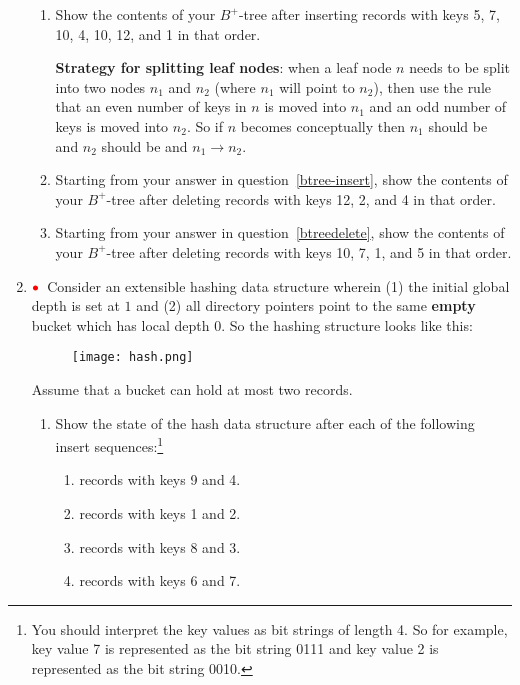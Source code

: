 \documentclass{article}
\newcommand{\redbullet}{$\textcolor{red}{\bullet}$}
\begin{document}
\begin{enumerate}[resume]
\begin{enumerate}
\item \label{btree-insert} Show the contents of your $B^+$-tree after
inserting records with keys 5, 7, 10, 4, 10, 12, and 1 in that order.

{\bf Strategy for splitting leaf nodes}: when a leaf node $n$ needs to be split into two nodes $n_1$ and $n_2$ (where $n_1$ will point to $n_2$), then use the
rule that an even number of keys in $n$ is moved into $n_1$ and an odd number of keys is moved into $n_2$.   So if $n$ becomes conceptually  then $n_1$ should be  and $n_2$ should be  and $n_1 \rightarrow n_2$.

\item\label{btreedelete} Starting from your answer in question~\ref{btree-insert}, show
  the contents of your $B^+$-tree after deleting records with keys 12, 2, and 4 in that order.
\item Starting from your answer in question~\ref{btreedelete}, show
  the contents of your $B^+$-tree after deleting records with keys 10, 7, 1, and 5 in that order.
\end{enumerate}

\newpage
\item \redbullet\ 
Consider an extensible hashing data structure wherein (1) the
initial global depth is set at $1$ and (2) all directory pointers point
to the same {\bf empty} bucket which has local depth $0$. So the hashing
structure looks like this:
\begin{figure}[h]
        \centering
        \texttt{[image: hash.png]}
    \end{figure}
\bigskip
Assume that a bucket can hold at most two records.

\begin{enumerate}
\item\label{ext-insert} Show the state of the hash data structure after each of the
  following insert sequences:\footnote{You should interpret the key values as bit strings of length 4.   So for example,  key value 7 is represented as the bit string 0111 
and key value 2 is represented as the bit string 0010.}

\begin{enumerate}
\item records with keys 9 and 4.
\item records with keys 1 and 2.
\item records with keys 8 and 3.
\item records with keys 6 and 7.
\end{enumerate}



\end{enumerate}
\end{enumerate}
\end{document}
